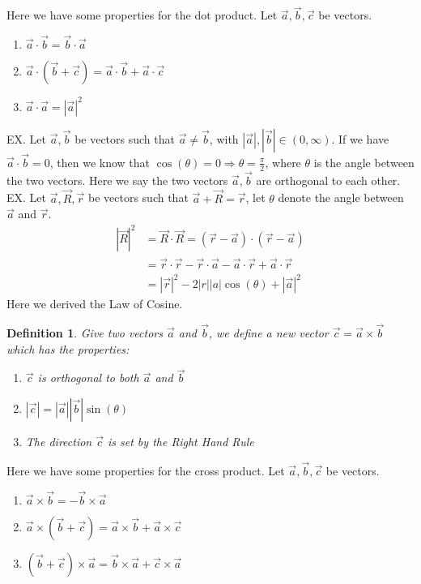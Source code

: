 \documentclass[11pt]{article}
\theoremstyle{break}
\theoremstyle{break}
\newtheorem{defn}{Definition}[corL]
\begin{document}
Here we have some properties for the dot product. Let $\vec{a},\vec{b},\vec{c}$ be vectors. 
\begin{enumerate}[topsep=3pt,itemsep=-1ex,partopsep=1ex,parsep=1ex]
\item $\vec{a}\cdot \vec{b} = \vec{b}\cdot \vec{a}$
\item $\vec{a}\cdot (\vec{b}+\vec{c}) = \vec{a}\cdot \vec{b}+\vec{a}\cdot \vec{c}$
\item $\vec{a}\cdot \vec{a} = |\vec{a}|^2$
\end{enumerate}
\hfill\break
\hfill\break
EX. Let $\vec{a},\vec{b}$ be vectors such that $\vec{a}\neq \vec{b}$, with $|\vec{a}|,|\vec{b}| \in (0,\infty)$. If we have $\vec{a}\cdot \vec{b} = 0$, then we know that $\cos(\theta) = 0 \Rightarrow \theta = \frac{\pi}{2}$, where $\theta$ is the angle between the two vectors. Here we say the two vectors $\vec{a},\vec{b}$ are orthogonal to each other.\\

EX. Let $\vec{a},\vec{R},\vec{r}$ be vectors such that $\vec{a}+\vec{R}=\vec{r}$, let $\theta$ denote the angle between $\vec{a}$ and $\vec{r}$.
\begin{align*}
|\vec{R}|^2 &= \vec{R}\cdot \vec{R} = (\vec{r}-\vec{a})\cdot (\vec{r}-\vec{a})\\
 &= \vec{r}\cdot \vec{r} - \vec{r}\cdot \vec{a}-\vec{a}\cdot \vec{r}+\vec{a}\cdot \vec{r}\\
 &=|\vec{r}|^2 - 2|r||a|\cos(\theta)+|\vec{a}|^2
\end{align*}
Here we derived the Law of Cosine. \\

\begin{defn}
Give two vectors $\vec{a}$ and $\vec{b}$, we define a new vector $\vec{c} = \vec{a}\times \vec{b}$ which has the properties:
\begin{enumerate}[topsep=3pt,itemsep=-1ex,partopsep=1ex,parsep=1ex]
\item $\vec{c}$ is orthogonal to both $\vec{a}$ and $\vec{b}$
\item $|\vec{c}| = |\vec{a}||\vec{b}| \sin(\theta)$
\item The direction $\vec{c}$ is set by the Right Hand Rule
\end{enumerate}
\end{defn}

Here we have some properties for the cross product. Let $\vec{a},\vec{b},\vec{c}$ be vectors. 
\begin{enumerate}[topsep=3pt,itemsep=-1ex,partopsep=1ex,parsep=1ex]
\item $\vec{a}\times \vec{b} = -\vec{b}\times \vec{a}$
\item $\vec{a}\times (\vec{b}+\vec{c}) = \vec{a}\times \vec{b} + \vec{a}\times \vec{c}$
\item $(\vec{b}+\vec{c})\times \vec{a} = \vec{b}\times \vec{a}+\vec{c}\times \vec{a}$
\end{enumerate}
\end{document}
